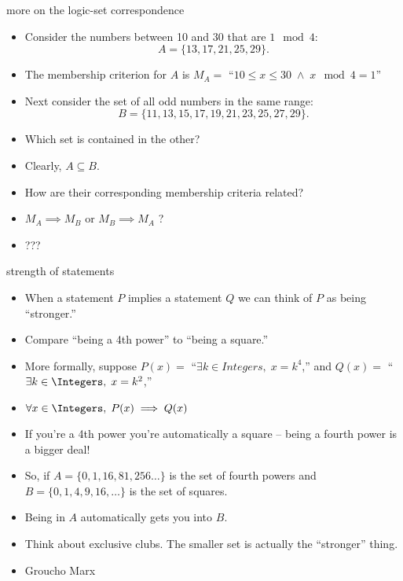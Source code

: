\documentclass[handout,landscape]{beamer}
\begin{document}
\begin{frame}{more on the logic-set correspondence}
\begin{itemize}
\item Consider the numbers between 10 and 30 that are $1\mod 4$: \pause \newline
\[ A = \{13, 17, 21, 25, 29\}. \] \pause
\item The membership criterion for $A$ is $M_A = $ ``$10 \leq x \leq 30 \; \land \; x \mod 4 = 1  $''
\item Next consider the set of all odd numbers in the same range: \pause \newline
\[ B = \{11, 13, 15, 17, 19, 21, 23, 25, 27, 29 \}. \] \pause
\item Which set is contained in the other? \pause
\item Clearly, $A \subseteq B$. \pause
\item How are their corresponding membership criteria related? \pause
\item $M_A \implies M_B$ \hspace{.1in} or \hspace{.1in} $M_B \implies M_A$ ? \pause
\item ???
\end{itemize}
\end{frame}

\begin{frame}{strength of statements}
\begin{itemize}
\item When a statement $P$ implies a statement $Q$ we can think of $P$ as being ``stronger.'' \pause
\item Compare ``being a 4th power'' to ``being a square.'' \pause
\item More formally, suppose $P(x) = $ ``$\exists k \in Integers, \; x=k^4$,'' \pause \newline
and $Q(x) = $ ``$\exists k \in \Integers, \; x=k^2$,'' \pause 
\item $\forall x \in \Integers, \; P(x) \implies Q(x)$ \pause
\item If you're a 4th power you're automatically a square -- being a fourth power is a bigger deal!\pause
\item So, if $A = \{0, 1, 16, 81, 256 \ldots \}$ is the set of fourth powers \pause \newline
and $B = \{0, 1, 4, 9, 16, \ldots \}$ is the set of squares. \pause
\item Being in $A$ automatically gets you into $B$. \pause
\item Think about exclusive clubs. \pause The smaller set is actually the ``stronger'' thing. \pause
\item Groucho Marx
\end{itemize}
\end{frame}
\end{document}

